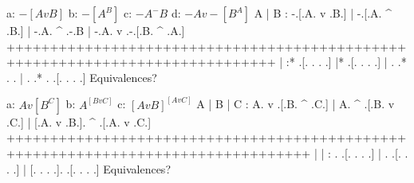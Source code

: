 \list
a: $ -[A v B] $
b: $ -[A ^ B] $
c: $ -A ^ -B $
d: $ -A v -[B ^ A] $
\endlist
        \answer
        \truthtable
         A | B : -.[.A. v .B.] | -.[.A. ^ .B.] | -.A. ^ .-.B | -.A. v .-.[.B. ^ .A.]
        +++++++++++++++++++++++++++++++++++++++++++++++++++++++++++++++++++++++++++++
           |   :* .[. .   . .] |* .[. .   . .] |  . .*  . .  |  . .*  . .[. .   . .]
        \endtruthtable
        Equivalences?
        \endanswer

\list
a: $ A v [B ^ C] $
b: $ A ^ [B v C] $
c: $ [A v B] ^ [A v C] $
\endlist
        \answer
        \truthtable
         A | B | C : A. v .[.B. ^ .C.] | A. ^ .[.B. v .C.] | [.A. v .B.]. ^ .[.A. v .C.]
        +++++++++++++++++++++++++++++++++++++++++++++++++++++++++++++++++++++++++++++++++
           |   |   :  .   .[. .   . .] |  .   .[. .   . .] | [. .   . .].   .[. .   . .]
        \endtruthtable
        Equivalences?
        \endanswer

\endproblems
\bye
